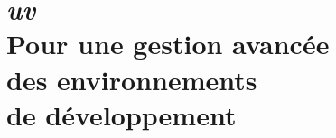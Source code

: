 \chapter[\textit{uv}]{\textit{uv} \\ Pour une gestion avancée \\ des environnements \\ de développement}

\bigskip


